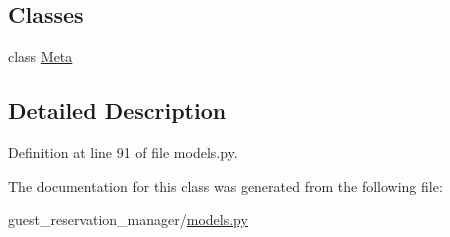 \subsection*{Classes}
\begin{DoxyCompactItemize}
\item 
class \hyperlink{classguest__reservation__manager_1_1models_1_1CreateGuestWishForm_1_1Meta}{Meta}
\end{DoxyCompactItemize}


\subsection{Detailed Description}


Definition at line 91 of file models.\-py.



The documentation for this class was generated from the following file\-:\begin{DoxyCompactItemize}
\item 
guest\-\_\-reservation\-\_\-manager/\hyperlink{guest__reservation__manager_2models_8py}{models.\-py}\end{DoxyCompactItemize}

